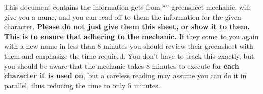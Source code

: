 \documentclass[green]{NeptuneBall}
\begin{document}
\name{\gBackgroundGM{}}

This document contains the information \cGeneral{\full} gets from \cGeneral{\their} ``\gBackground{}'' greensheet mechanic. \cGeneral{\They} will give you a name, and you can read off to them the information for the given character. \textbf{Please do not just give them this sheet, or show it to them. This is to ensure that \cGeneral{\they} \cGeneral{\are} adhering to the mechanic.} If they come to you again with a new name in less than 8 minutes you should review their greensheet with them and emphasize the time required. You don't have to track this exactly, but you should be aware that the mechanic takes 8 minutes to execute for \textbf{each character it is used on}, but a careless reading may assume you can do it in parallel, thus reducing the time to only 5 minutes.
\end{document}
